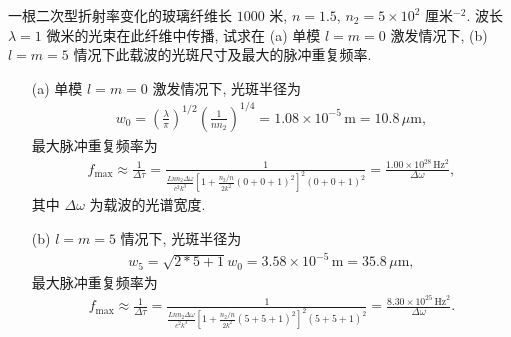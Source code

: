 \documentclass{note}
\begin{document}
\begin{exe}
    一根二次型折射率变化的玻璃纤维长 $1000$ 米, $n=1.5$, $n_2=5\times 10^2$ 厘米${}^{-2}$. 波长 $\lambda=1$ 微米的光束在此纤维中传播, 试求在 (a) 单模 $l=m=0$ 激发情况下, (b) $l=m=5$ 情况下此载波的光斑尺寸及最大的脉冲重复频率.
\end{exe}
\begin{sol}
    \begin{itemize}
        \item[(a)] 单模 $l=m=0$ 激发情况下, 光斑半径为
        \begin{align}
            w_0=\left(\frac{\lambda}{\pi}\right)^{1/2}\left(\frac{1}{nn_2}\right)^{1/4}=1.08\times 10^{-5}\,\text{m}=10.8\,\mu\text{m},
        \end{align}
        最大脉冲重复频率为
        \begin{align}
            f_{\max}\approx\frac{1}{\Delta\tau}=\frac{1}{\frac{Lnn_2\Delta\omega}{c^2k^3}\left[1+\frac{n_2/n}{2k^2}(0+0+1)^2\right]^2(0+0+1)^2}=\frac{1.00\times 10^{28}\,\text{Hz}^2}{\Delta\omega},
        \end{align}
        其中 $\Delta\omega$ 为载波的光谱宽度.
        \item[(b)] $l=m=5$ 情况下, 光斑半径为
        \begin{align}
            w_5=\sqrt{2*5+1}w_0=3.58\times 10^{-5}\,\text{m}=35.8\,\mu\text{m},
        \end{align}
        最大脉冲重复频率为
        \begin{align}
            f_{\max}\approx\frac{1}{\Delta\tau}=\frac{1}{\frac{Lnn_2\Delta\omega}{c^2k^3}\left[1+\frac{n_2/n}{2k^2}(5+5+1)^2\right]^2(5+5+1)^2}=\frac{8.30\times 10^{25}\,\text{Hz}^2}{\Delta\omega}.
        \end{align}
    \end{itemize}
\end{sol}
\end{document}
